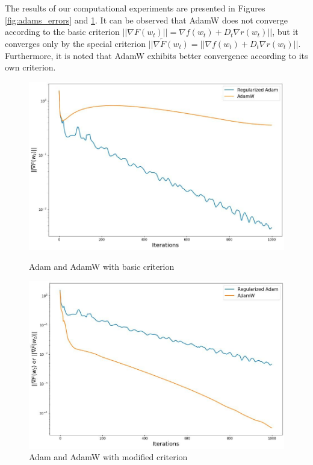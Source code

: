 \documentclass[USenglish]{article}
\theoremstyle{dgthm}
\theoremstyle{dgdef}
\begin{document}
The results of our computational experiments are presented in Figures \ref{fig:adams_errors} and \ref{fig:adams_special_errors}.
It can be observed that AdamW does not converge according to the basic criterion $||\nabla F(w_t)|| = \nabla f(w_t) + D_t \nabla r(w_t)||$, but it converges only by the special criterion $||\nabla \widetilde{F}(w_t) = ||\nabla f(w_t) + D_t \nabla r(w_t)||$.
Furthermore, it is noted that AdamW exhibits better convergence according to its own criterion.

\begin{figure}[H]
\begin{minipage}[h]{0.5\linewidth}
\centering
\includegraphics[width=\linewidth]{pictures/adams_errors.jpeg}
\captionsetup{justification=centering,margin=0.5cm}
\caption{Adam and AdamW with basic criterion}
\label{fig:adams_errors}
\end{minipage}
\hfill
\begin{minipage}[h]{0.5\linewidth}
\includegraphics[width=\linewidth]{pictures/adams_special_errors.jpeg}
\captionsetup{justification=centering,margin=0.5cm}
\caption{Adam and AdamW with modified criterion}
\label{fig:adams_special_errors}
\end{minipage}
\end{figure}
\end{document}
